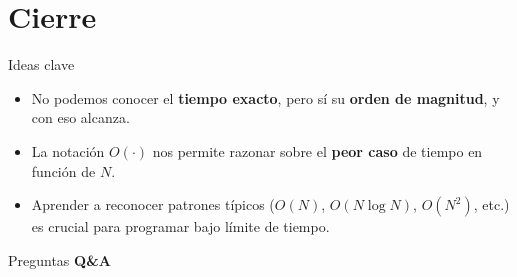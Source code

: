 \documentclass[aspectratio=169]{beamer}
\begin{document}
\section*{Cierre}

\begin{frame}{Ideas clave}
  \begin{itemize}
    \item No podemos conocer el \textbf{tiempo exacto}, pero sí su \textbf{orden de magnitud}, y con eso alcanza.
    \item La notación \(O(\cdot)\) nos permite razonar sobre el \textbf{peor caso} de tiempo en función de \(N\).
    \item Aprender a reconocer patrones típicos (\(O(N)\), \(O(N \log N)\), \(O(N^2)\), etc.) es crucial para programar bajo límite de tiempo.
  \end{itemize}
\end{frame}

\begin{frame}{Preguntas}
  \centering
  \Huge
  \textbf{Q\&A}
\end{frame}
\end{document}

